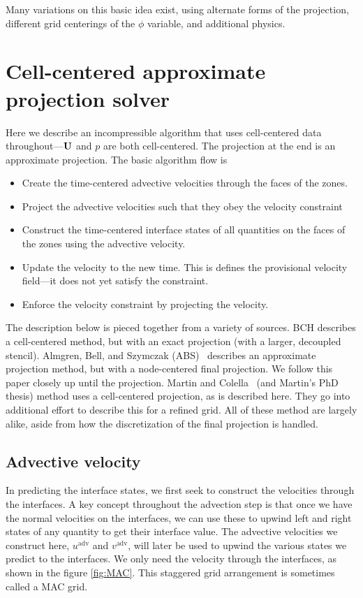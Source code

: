 Many variations on this basic idea exist, using alternate forms of the
projection, different grid centerings of the $\phi$ variable, and
additional physics.


\section{Cell-centered approximate projection solver}

Here we describe an incompressible algorithm that uses cell-centered
data throughout---${\bf U}$ and $p$ are both cell-centered.  The
projection at the end is an approximate projection.  The basic
algorithm flow is 
\begin{itemize}
\item Create the time-centered advective velocities through the faces
  of the zones.
\item Project the advective velocities such that they obey the
  velocity constraint
\item Construct the time-centered interface states of all quantities
  on the faces of the zones using the advective velocity.
\item Update the velocity to the new time.  This is defines the
  provisional velocity field---it does not yet satisfy the constraint.
\item Enforce the velocity constraint by projecting the velocity.
\end{itemize}

The description below is pieced together from a variety of sources.
BCH describes a cell-centered method, but with an exact projection
(with a larger, decoupled stencil).  Almgren, Bell, and Szymczak
(ABS)~\cite{ABS} describes an approximate projection method, but with
a node-centered final projection.  We follow this paper closely up
until the projection.  Martin and Colella~\cite{MartinColella} (and
Martin's PhD thesis) method uses a cell-centered projection, as is
described here.  They go into additional effort to describe this for a
refined grid.  All of these method are largely alike, aside from how
the discretization of the final projection is handled.

\subsection{Advective velocity}

In predicting the interface states, we first seek to construct the
velocities through the interfaces.  A key concept throughout the
advection step is that once we have the normal velocities on the
interfaces, we can use these to upwind left and right states of any
quantity to get their interface value.  The advective velocities we
construct here, ${u}^\mathrm{adv}$ and ${v}^\mathrm{adv}$,
will later be used to upwind the various states we predict to the
interfaces.  We only need the velocity through the interfaces, as
shown in the figure \ref{fig:MAC}. This staggered grid arrangement is
sometimes called a MAC grid.

